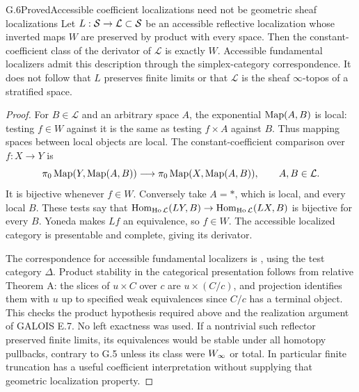 \begin{statement}{G.6}{Proved}{Accessible coefficient localizations need not be geometric sheaf localizations}
Let $L:\mathcal S\to\mathcal L\subset\mathcal S$ be an accessible
reflective localization whose inverted maps $W$ are preserved by
product with every space. Then the constant-coefficient class of the
derivator of $\mathcal L$ is exactly $W$. Accessible fundamental
localizers admit this description through the simplex-category
correspondence. It does not follow that $L$ preserves finite limits or
that $\mathcal L$ is the sheaf $\infty$-topos of a stratified space.
\end{statement}
\begin{proof}
For $B\in\mathcal L$ and an arbitrary space $A$, the exponential
$\operatorname{Map}(A,B)$ is local: testing $f\in W$ against it is the same as testing
$f\times A$ against $B$. Thus mapping spaces between local objects are
local. The constant-coefficient comparison over $f:X\to Y$ is
\[
 \pi_0\operatorname{Map}(Y,\operatorname{Map}(A,B))\longrightarrow
 \pi_0\operatorname{Map}(X,\operatorname{Map}(A,B)),\qquad A,B\in\mathcal L.
\]
It is bijective whenever $f\in W$. Conversely take $A=*$, which is
local, and every local $B$. These tests say that
$\operatorname{Hom}_{\operatorname{Ho}\mathcal L}(LY,B)\to\operatorname{Hom}_{\operatorname{Ho}\mathcal L}(LX,B)$ is
bijective for every $B$. Yoneda makes $Lf$ an equivalence, so $f\in W$.
The accessible localized category is presentable and complete, giving
its derivator.

The correspondence for accessible fundamental localizers is
\citet[Theorems 4.2.15 and 1.4.3]{E_Cisinski2006}, using the test
category $\Delta$. Product stability in the categorical presentation
follows from relative Theorem A: the slices of $u\times C$ over $c$
are $u\times(C/c)$, and projection identifies them with $u$ up to
specified weak equivalences since $C/c$ has a terminal object.
This checks the product hypothesis required above and the realization
argument of GALOIS E.7. No left exactness was used. If a nontrivial
such reflector preserved finite limits, its equivalences would be
stable under all homotopy pullbacks, contrary to G.5 unless its class
were $W_{\infty}$ or total. In particular finite truncation has a useful
coefficient interpretation without supplying that geometric
localization property.
\end{proof}


